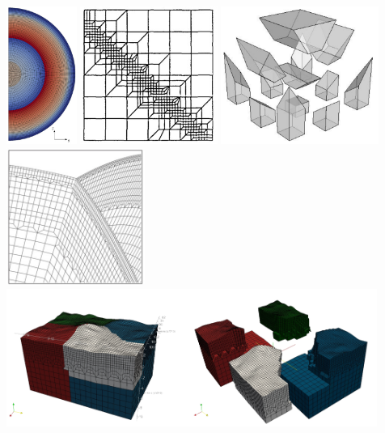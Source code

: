 \begin{center}
\includegraphics[height=4.5cm]{images/meshes/vaks15}
\includegraphics[height=4.5cm]{images/meshes/depl96}
\includegraphics[height=4.5cm]{images/meshes/habo04}\\
\includegraphics[height=4.5cm]{images/meshes/kott05}
\includegraphics[height=4.5cm]{images/meshes/specfem}\\

\end{center}
